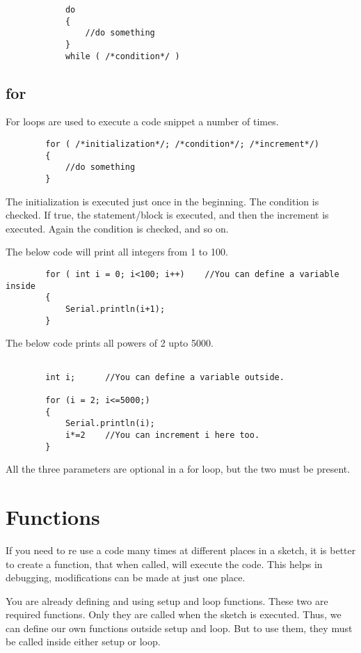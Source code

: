 \documentclass{article}
\begin{document}
			\begin{lstlisting}
			do
			{
				//do something
			}
			while ( /*condition*/ )
			\end{lstlisting}

	\subsection{for}

		For loops are used to execute a code snippet a number of times.

		\begin{lstlisting}
		for ( /*initialization*/; /*condition*/; /*increment*/)
		{
			//do something
		}
		\end{lstlisting}

		The initialization is executed just once in the beginning. The condition is checked. If true, the statement/block is executed, and then the increment is executed. Again the condition is checked, and so on.

		The below code will print all integers from 1 to 100.

		\begin{lstlisting}
		for ( int i = 0; i<100; i++)	//You can define a variable inside
		{
			Serial.println(i+1);
		}
		\end{lstlisting}

		The below code prints all powers of 2 upto 5000.

		\begin{lstlisting}

		int i; 		//You can define a variable outside.

		for (i = 2; i<=5000;)
		{
			Serial.println(i);
			i*=2	//You can increment i here too.
		}
		\end{lstlisting}

		All the three parameters are optional in a for loop, but the two \inlncd{;} must be present.

\section{Functions}
	
	If you need to re use a code many times at different places in a sketch, it is better to create a function, that when called, will execute the code. This helps in debugging, modifications can be made at just one place.

	You are already defining and using setup and loop functions. These two are required functions. Only they are called when the sketch is executed. Thus, we can define our own functions outside setup and loop. But to use them, they must be called inside either setup or loop.
\end{document}
